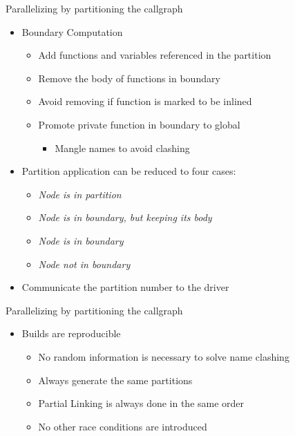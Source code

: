 
\begin{frame}{Parallelizing by partitioning the callgraph}

\begin{itemize}
    \item Boundary Computation
    \begin{itemize}
        \item Add functions and variables referenced in the partition
        \item Remove the body of functions in boundary
        \item Avoid removing if function is marked to be inlined
        \item Promote private function in boundary to global
        \begin{itemize}
            \item Mangle names to avoid clashing
        \end{itemize}
    \end{itemize}
    \item Partition application can be reduced to four cases:
    \begin{itemize}
        \item \textit{Node is in partition}
        \item \textit{Node is in boundary, but keeping its body}
        \item \textit{Node is in boundary}
        \item \textit{Node not in boundary}
    \end{itemize}
    \item Communicate the partition number to the driver
\end{itemize}
\end{frame}


\begin{frame}{Parallelizing by partitioning the callgraph}

\begin{itemize}
    \item Builds are reproducible
    \begin{itemize}
        \item No random information is necessary to solve name clashing
        \item Always generate the same partitions
        \item Partial Linking is always done in the same order
        \item No other race conditions are introduced
    \end{itemize}
\end{itemize}
\end{frame}

